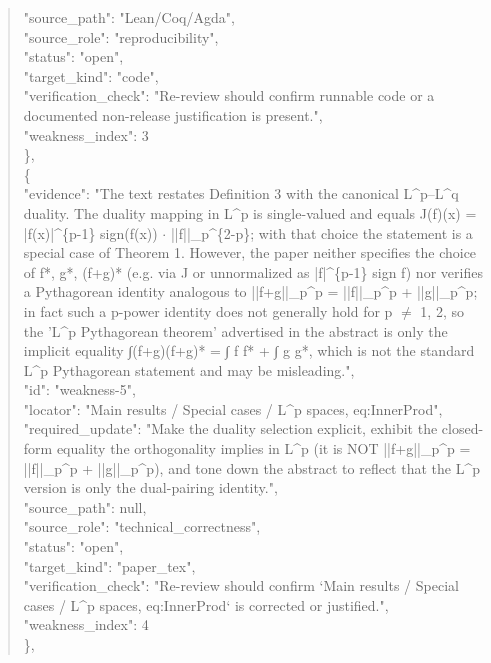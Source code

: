 \documentclass[11pt]{article}
\begin{document}
\begin{quote}
      "source\_path": "Lean/Coq/Agda",\\
      "source\_role": "reproducibility",\\
      "status": "open",\\
      "target\_kind": "code",\\
      "verification\_check": "Re-review should confirm runnable code or a documented non-release justification is present.",\\
      "weakness\_index": 3\\
    \},\\
    \{\\
      "evidence": "The text restates Definition 3 with the canonical L\^{}p--L\^{}q duality. The duality mapping in L\^{}p is single-valued and equals J(f)(x) = |f(x)|\^{}\{p-1\} sign(f(x)) \ensuremath{\cdot} ||f||\_p\^{}\{2-p\}; with that choice the statement is a special case of Theorem 1. However, the paper neither specifies the choice of f*, g*, (f+g)* (e.g. via J or unnormalized as |f|\^{}\{p-1\} sign f) nor verifies a Pythagorean identity analogous to ||f+g||\_p\^{}p = ||f||\_p\^{}p + ||g||\_p\^{}p; in fact such a p-power identity does not generally hold for p \ensuremath{\ne} 1, 2, so the 'L\^{}p Pythagorean theorem' advertised in the abstract is only the implicit equality ∫(f+g)(f+g)* = ∫ f f* + ∫ g g*, which is not the standard L\^{}p Pythagorean statement and may be misleading.",\\
      "id": "weakness-5",\\
      "locator": "Main results / Special cases / L\^{}p spaces, eq:InnerProd",\\
      "required\_update": "Make the duality selection explicit, exhibit the closed-form equality the orthogonality implies in L\^{}p (it is NOT ||f+g||\_p\^{}p = ||f||\_p\^{}p + ||g||\_p\^{}p), and tone down the abstract to reflect that the L\^{}p version is only the dual-pairing identity.",\\
      "source\_path": null,\\
      "source\_role": "technical\_correctness",\\
      "status": "open",\\
      "target\_kind": "paper\_tex",\\
      "verification\_check": "Re-review should confirm `Main results / Special cases / L\^{}p spaces, eq:InnerProd` is corrected or justified.",\\
      "weakness\_index": 4\\
    \},\\

\end{quote}
\end{document}
